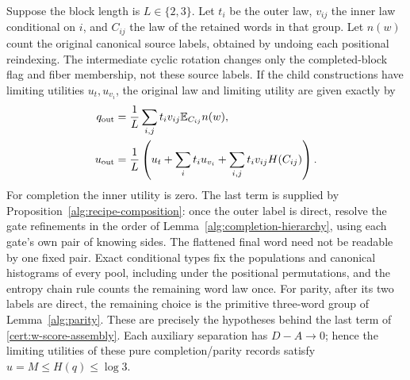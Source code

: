 \documentclass[11pt]{article}
\numberwithin{equation}{section}
\theoremstyle{definition}
\theoremstyle{remark}
\newcommand{\E}{\mathbb E}
\begin{document}
Suppose the block length is $L\in\{2,3\}$.  Let $t_i$ be the outer
law, $v_{ij}$ the inner law conditional on $i$, and $C_{ij}$ the law of
the retained words in that group.  Let $n(w)$ count the original canonical source labels, obtained by
undoing each positional reindexing.  The intermediate cyclic rotation
changes only the completed-block flag and fiber membership, not these
source labels.  If the child constructions
have limiting utilities $u_t,u_{v_i}$, the original law and limiting utility
are given exactly by
\begin{align}
 q_{\rm out}&=\frac1L\sum_{i,j}t_iv_{ij}\E_{C_{ij}}n(w),
 \label{cert:w-law-assembly}\\
 u_{\rm out}&=\frac1L\left(u_t+\sum_it_i u_{v_i}
                      +\sum_{i,j}t_iv_{ij}H(C_{ij})\right).
 \label{cert:w-score-assembly}
\end{align}
For completion the inner utility is zero.  The last term is supplied by
Proposition~\ref{alg:recipe-composition}: once the outer label is direct,
resolve the gate refinements in the order of
Lemma~\ref{alg:completion-hierarchy}, using each gate's own pair of
knowing sides.  The flattened final word need not be readable by one fixed
pair.  Exact conditional types fix the populations and canonical histograms
of every pool, including under the positional permutations, and the entropy
chain rule counts the remaining word law once.  For parity, after its two
labels are direct, the remaining choice is the primitive three-word group
of Lemma~\ref{alg:parity}.  These are precisely the hypotheses behind the
last term of \eqref{cert:w-score-assembly}.  Each auxiliary separation has
$D-A\to0$; hence the limiting utilities of these pure completion/parity
records satisfy $u=M\le H(q)\le\log3$.
\end{document}
